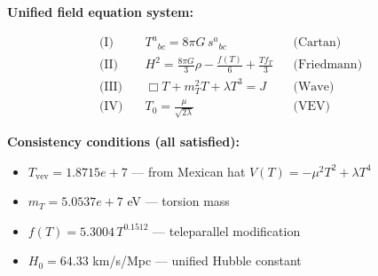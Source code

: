 
\textbf{Unified field equation system:}

\begin{align}
  \text{(I)} \quad & T^a{}_{bc} = 8\pi G \, s^a{}_{bc} && \text{(Cartan)} \\
  \text{(II)} \quad & H^2 = \frac{8\pi G}{3}\rho - \frac{f(T)}{6} + \frac{Tf_T}{3} && \text{(Friedmann)} \\
  \text{(III)} \quad & \Box T + m_T^2 T + \lambda T^3 = J && \text{(Wave)} \\
  \text{(IV)} \quad & T_0 = \frac{\mu}{\sqrt{2\lambda}} && \text{(VEV)}
\end{align}

\textbf{Consistency conditions (all satisfied):}
\begin{itemize}
  \item $T_{\text{vev}} = 1.8715e+7$ — from Mexican hat $V(T) = -\mu^2 T^2 + \lambda T^4$
  \item $m_T = 5.0537e+7$ eV — torsion mass
  \item $f(T) = 5.3004 \, T^{0.1512}$ — teleparallel modification
  \item $H_0 = 64.33$ km/s/Mpc — unified Hubble constant
\end{itemize}